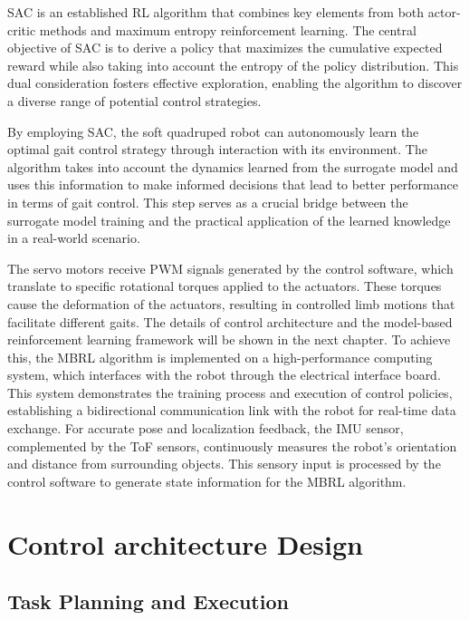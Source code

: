 SAC is an established RL algorithm that combines key elements from both actor-critic methods and maximum entropy reinforcement learning. The central objective of SAC is to derive a policy that maximizes the cumulative expected reward while also taking into account the entropy of the policy distribution. This dual consideration fosters effective exploration, enabling the algorithm to discover a diverse range of potential control strategies.

By employing SAC, the soft quadruped robot can autonomously learn the optimal gait control strategy through interaction with its environment. The algorithm takes into account the dynamics learned from the surrogate model and uses this information to make informed decisions that lead to better performance in terms of gait control. This step serves as a crucial bridge between the surrogate model training and the practical application of the learned knowledge in a real-world scenario.

The servo motors receive \ac{PWM} signals generated by the control software, which translate to specific rotational torques applied to the actuators. These torques cause the deformation of the actuators, resulting in controlled limb motions that facilitate different gaits. The details of control architecture and the model-based reinforcement learning framework will be shown in the next chapter. To achieve this, the MBRL algorithm is implemented on a high-performance computing system, which interfaces with the robot through the electrical interface board. This system demonstrates the training process and execution of control policies, establishing a bidirectional communication link with the robot for real-time data exchange. For accurate pose and localization feedback, the \ac{IMU} sensor, complemented by the \ac{ToF} sensors, continuously measures the robot's orientation and distance from surrounding objects. This sensory input is processed by the control software to generate state information for the MBRL algorithm.


\section{Control architecture Design}


\subsection{Task Planning and Execution}

